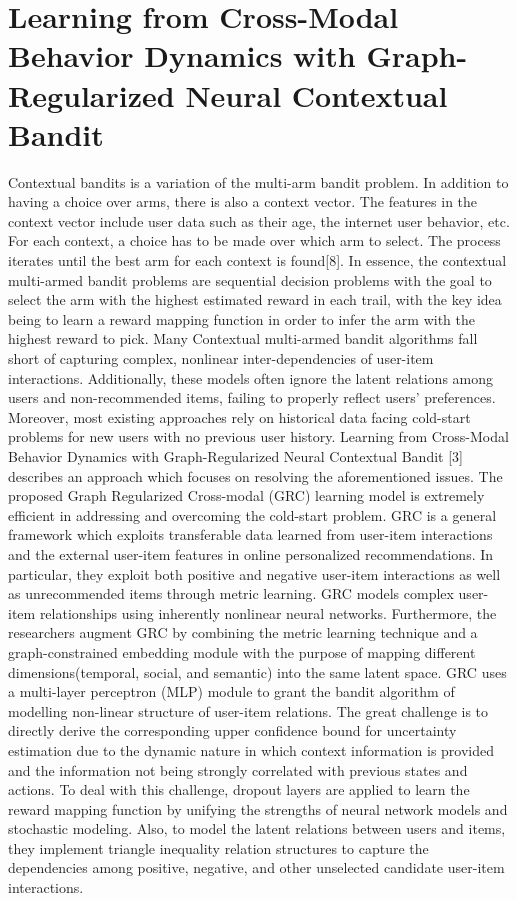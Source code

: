 \section {Learning from Cross-Modal Behavior Dynamics with
Graph-Regularized Neural Contextual Bandit}

Contextual bandits is a variation of the multi-arm bandit problem. In addition to having a choice over arms, there is also a context vector. The features in the context vector include user data such as their age, the internet user behavior, etc. For each context, a choice has to be made over which arm to select. The process iterates until the best arm for each context is found[8]. In essence, the contextual multi-armed bandit problems are sequential decision problems with the goal to select the arm with the highest estimated reward in each trail, with the key idea being to learn a reward mapping function in order to infer the arm with the highest reward to pick. Many Contextual multi-armed bandit algorithms fall short of capturing complex, nonlinear inter-dependencies of user-item interactions. Additionally, these models often ignore the latent relations among users and non-recommended items, failing to properly reflect users’ preferences. Moreover, most existing approaches rely on historical data facing cold-start problems for new users with no previous user history. Learning from Cross-Modal Behavior Dynamics with Graph-Regularized Neural Contextual Bandit [3] describes an approach which focuses on resolving the aforementioned issues. The proposed Graph Regularized Cross-modal (GRC) learning model is extremely efficient in addressing and overcoming the cold-start problem. GRC is a general framework which exploits transferable data learned from user-item interactions and the external user-item features in online personalized recommendations. In particular, they exploit both positive and negative user-item interactions as well as unrecommended items through metric learning. GRC models complex user-item relationships using inherently nonlinear neural networks. Furthermore, the researchers augment GRC by combining the metric learning technique and a graph-constrained embedding module with the purpose of mapping different dimensions(temporal, social, and semantic) into the same latent space. GRC uses a multi-layer perceptron (MLP) module to grant the bandit algorithm of modelling non-linear structure of user-item relations. The great challenge is to directly derive the corresponding upper confidence bound for uncertainty estimation due to the dynamic nature in which context information is provided and the information not being strongly correlated with previous states and actions. To deal with this challenge, dropout layers are applied to learn the reward mapping function by unifying the strengths of neural network models and stochastic modeling. Also, to model the latent relations between users and items, they implement triangle inequality relation structures to capture the dependencies among positive, negative, and other unselected candidate user-item interactions. 

